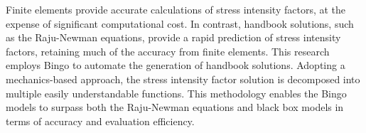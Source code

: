 
Finite elements provide accurate calculations of stress intensity factors, at the expense of significant computational cost. In contrast, handbook solutions, such as the Raju-Newman equations, provide a rapid prediction of stress intensity factors, retaining much of the accuracy from finite elements. This research employs Bingo to automate the generation of handbook solutions. Adopting a mechanics-based approach, the stress intensity factor solution is decomposed into multiple easily understandable functions. This methodology enables the Bingo models to surpass both the Raju-Newman equations and black box models in terms of accuracy and evaluation efficiency.